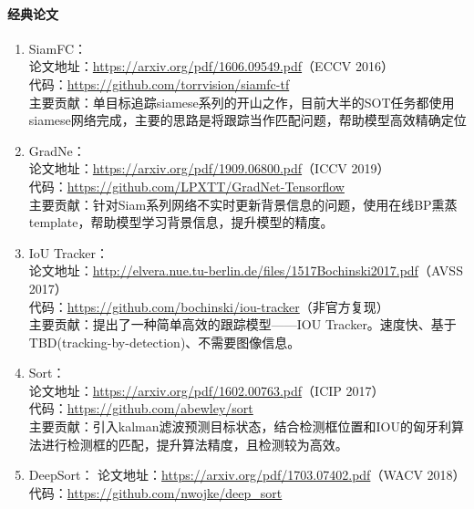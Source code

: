 \documentclass[lang=cn,11pt,a4paper]{eleganttemplate}
\begin{document}
\paragraph{经典论文}
\begin{enumerate}
    \item SiamFC：\\
    论文地址：\href{https://arxiv.org/pdf/1606.09549.pdf}{https://arxiv.org/pdf/1606.09549.pdf}（ECCV 2016） \\
    代码：\href{https://github.com/torrvision/siamfc-tf}{https://github.com/torrvision/siamfc-tf}  \\
    主要贡献：单目标追踪siamese系列的开山之作，目前大半的SOT任务都使用siamese网络完成，主要的思路是将跟踪当作匹配问题，帮助模型高效精确定位
    \item GradNe：\\
    论文地址：\href{https://arxiv.org/pdf/1909.06800.pdf}{https://arxiv.org/pdf/1909.06800.pdf}（ICCV 2019） \\
    代码：\href{https://github.com/LPXTT/GradNet-Tensorflow}{https://github.com/LPXTT/GradNet-Tensorflow}  \\
    主要贡献：针对Siam系列网络不实时更新背景信息的问题，使用在线BP熏蒸template，帮助模型学习背景信息，提升模型的精度。
    \item IoU Tracker：\\
    论文地址：\href{http://elvera.nue.tu-berlin.de/files/1517Bochinski2017.pdf}{http://elvera.nue.tu-berlin.de/files/1517Bochinski2017.pdf}（AVSS 2017） \\
    代码：\href{https://github.com/bochinski/iou-tracker}{https://github.com/bochinski/iou-tracker}（非官方复现） \\
    主要贡献：提出了一种简单高效的跟踪模型——IOU Tracker。速度快、基于TBD(tracking-by-detection)、不需要图像信息。
    \item Sort：\\
    论文地址：\href{https://arxiv.org/pdf/1602.00763.pdf}{https://arxiv.org/pdf/1602.00763.pdf}（ICIP 2017） \\
    代码：\href{https://github.com/abewley/sort}{https://github.com/abewley/sort} \\
    主要贡献：引入kalman滤波预测目标状态，结合检测框位置和IOU的匈牙利算法进行检测框的匹配，提升算法精度，且检测较为高效。
    \item DeepSort：
    论文地址：\href{https://arxiv.org/pdf/1703.07402.pdf}{https://arxiv.org/pdf/1703.07402.pdf}（WACV 2018）\\
    代码：\href{https://github.com/nwojke/deep_sort}{https://github.com/nwojke/deep\_sort} \\

\end{enumerate}
\end{document}
